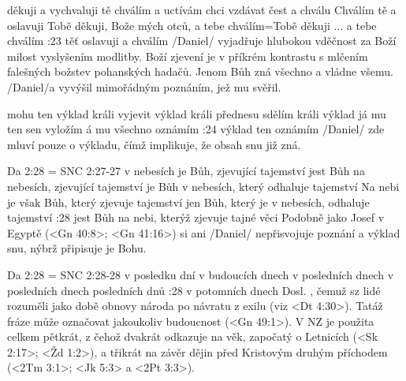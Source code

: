     {děkuji a vychvaluji tě} %
    {chválím a uctívám}  %
    {chci vzdávat čest a chválu} %
    {Chválím tě a oslavuji}  %
    {Tobě děkuji, Bože mých otců, a tebe chválím}={Tobě děkuji ... a tebe chválím}  %
:23 {těť oslavuji a chválím} \x/Daniel/ vyjadřuje hlubokou vděčnost za Boží milost vyslyšením modlitby. Boží zjevení je v příkrém kontrastu s mlčením falešných božstev pohanských hadačů. Jenom Bůh zná všechno a vládne všemu. \x/Daniel/a vyvýšil mimořádným poznáním, jež mu svěřil.

    {mohu ten výklad králi vyjevit}  %
    {výklad králi přednesu}  %
    {sdělím králi výklad} %
    {já mu ten sen vyložím}  %
    {á mu všechno oznámím}  %
:24 {výklad ten oznámím} \x/Daniel/ zde mluví pouze o výkladu, čímž implikuje, že obsah snu  již zná.


\renum Da 2:28 = SNC 2:27-27
    {v nebesích je Bůh, zjevující tajemství}  %
    {jest Bůh na nebesích, zjevující tajemství}  %
    {je Bůh v nebesích, který odhaluje tajemství}  %
    {Na nebi je však Bůh, který zjevuje tajemství}  %
    {jen Bůh, který je v nebesích, odhaluje tajemství}  %
:28 {jest Bůh na nebi, kterýž zjevuje tajné věci} Podobně jako Josef v Egyptě (<Gn 40:8>; <Gn 41:16>) si ani \x/Daniel/ nepřisvojuje poznání a výklad snu, nýbrž připisuje je Bohu.

\renum Da 2:28 = SNC 2:28-28
    {v posledku dní} %
    {v budoucích dnech}  %
    {v posledních dnech} %
    {v posledních dnech}  %
    {posledních dnů}  %
:28 {v potomních dnech} Dosl. , čemuž sz lidé rozuměli jako době obnovy národa po návratu z exilu (viz <Dt 4:30>). Tatáž fráze může označovat 
    jakoukoliv budoucnost  (<Gn 49:1>).  V NZ je použita celkem pětkrát, z čehož dvakrát odkazuje na věk, započatý o Letnicích (<Sk 2:17>; <Žd 1:2>), a třikrát na závěr dějin před Kristovým druhým příchodem (<2Tm 3:1>; <Jk 5:3> a <2Pt 3:3>). 

